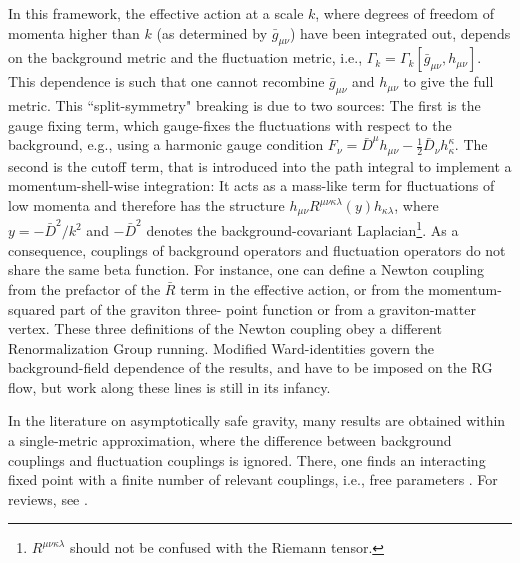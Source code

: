 \documentclass[twocolumn,prd,superscriptaddress,preprintnumbers,amsmath,amssymb,nofootinbib]{revtex4}
\begin{document}
In this framework, the effective action at a scale $k$, where degrees of freedom of momenta higher than $k$ (as determined by $\bar{g}_{\mu \nu}$) have been integrated out, depends on the background metric and the fluctuation metric, i.e., $\Gamma_k = \Gamma_k[\bar{g}_{\mu \nu}, h_{\mu \nu}]$. This dependence is such that one cannot recombine $\bar{g}_{\mu \nu}$ and $h_{\mu \nu}$ to give the full metric.
This ``split-symmetry" breaking is due to two sources:
The first is the gauge fixing term, which gauge-fixes the fluctuations with respect to the background, e.g., using a harmonic gauge condition $F_{\nu}=\bar{D}^{\mu}h_{\mu \nu} -\frac{1}{2} \bar{D}_{\nu}h^{\kappa}_{\kappa}$.
The second is the cutoff term, that is introduced into the path integral to implement a momentum-shell-wise integration: It acts as a mass-like term for fluctuations of low momenta and therefore has the structure $h_{\mu \nu} R^{\mu \nu \kappa \lambda} (y) h_{\kappa \lambda}$, where $y=-\bar{D}^2/k^2$ and $-\bar{D}^2$ denotes the background-covariant Laplacian\footnote{$R^{\mu \nu \kappa \lambda}$ should not be confused with the
Riemann tensor.}.
As a consequence, couplings of background operators and fluctuation operators do not share the same beta function. For instance, one can define a Newton coupling from the prefactor of the $\bar{R}$ term in the effective action, or from the momentum-squared part of the graviton three- point function or from a graviton-matter vertex. These three definitions of the Newton coupling obey a different Renormalization Group running. Modified Ward-identities govern the background-field dependence of the results, and have to be imposed on the RG flow, but work along these lines is still in its infancy.

In the literature on asymptotically safe gravity, many results are obtained within a single-metric approximation, where the difference between background couplings and fluctuation couplings is ignored. There, one finds an interacting fixed point with a finite number of relevant couplings, i.e., free parameters \cite{Reuter:1996cp,Dou:1997fg,Reuter:2001ag,Lauscher:2001ya,Lauscher:2002sq,Litim:2003vp,Fischer:2006fz,Machado:2007ea,Eichhorn:2009ah,
Codello:2006in,Codello:2008vh,Benedetti:2009rx,Eichhorn:2010tb, Groh:2010ta,Manrique:2011jc,Rechenberger:2012dt,Benedetti:2012dx,Dietz:2012ic,
Falls:2013bv,Benedetti:2013jk,Ohta:2013uca, Demmel:2014sga,Falls:2014tra, Falls:2015qga, Falls:2015cta,Gies:2015tca, Demmel:2015oqa}. For reviews, see \cite{ASreviews}.
\end{document}
